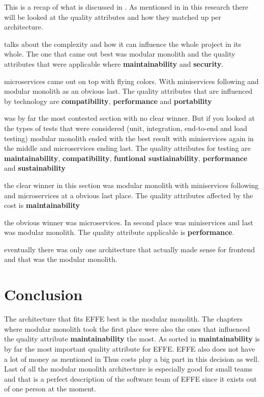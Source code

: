 This is a recap of what is discussed in . As mentioned in  in this research there will be looked at the quality attributes and how they matched up per architecture.

 talks about the complexity and how it can influence the whole project in its whole. The one that came out best was modular monolith and the quality attributes that were applicable where \textbf{maintainability} and \textbf{security}.

 microservices came out on top with flying colors. With miniservices following and modular monolith as an obvious last. The quality attributes that are influenced by technology are \textbf{compatibility}, \textbf{performance} and \textbf{portability}

 was by far the most contested section with no clear winner. But if you looked at the types of tests that were considered (unit, integration, end-to-end and load testing) modular monolith ended with the best result with miniservices again in the middle and microservices ending last. The quality attributes for testing are \textbf{maintainability}, \textbf{compatibility}, \textbf{funtional sustiainability}, \textbf{performance} and \textbf{sustainability}

 the clear winner in this section was modular monolith with miniservices following and microservices at a obvious last place. The quality attributes affected by the cost is \textbf{maintainability}

 the obvious winner was microservices. In second place was miniservices and last was modular monolith. The quality attribute applicable is \textbf{performance}.

 eventually there was only one architecture that actually made sense for frontend and that was the modular monolith.

\section{Conclusion}

The architecture that fits EFFE best is the modular monolith. The chapters where modular monolith took the first place were also the ones that influenced the quality attribute \textbf{maintainability} the most. As sorted in  \textbf{maintainability} is by far the most important quality attribute for EFFE. EFFE also does not have a lot of money as mentioned in  Thus costs play a big part in this decision as well. Last of all the modular monolith architecture is especially good for small teams and that is a perfect description of the software team of EFFE since it exists out of one person at the moment.

